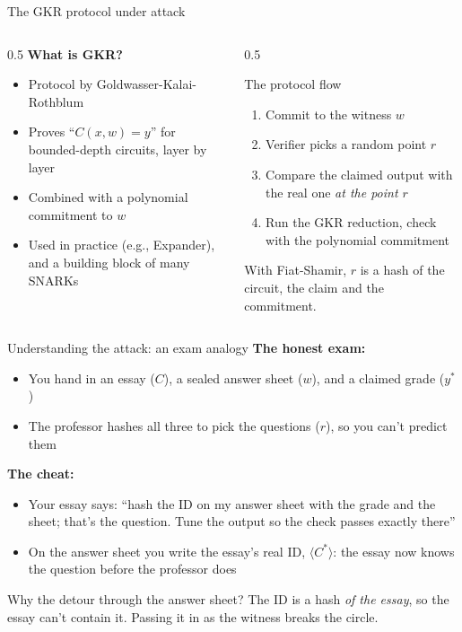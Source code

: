 \ifdefined\PRESENTATION\else\PassOptionsToClass{handout}{beamer}\fi\documentclass[aspectratio=169, lualatex]{beamer}
\begin{document}
\begin{frame}{The GKR protocol under attack}
	\begin{columns}[c]
		\begin{column}{0.5\textwidth}
			\textbf{What is GKR?}
			\begin{itemize}
				\item Protocol by Goldwasser-Kalai-Rothblum
				\item Proves ``$C(x, w) = y$'' for bounded-depth circuits, layer by layer
				\item Combined with a polynomial commitment to $w$
				\item Used in practice (e.g., Expander), and a building block of many SNARKs
			\end{itemize}
		\end{column}
		\begin{column}{0.5\textwidth}
			\begin{exampleblock}{The protocol flow}
				\begin{enumerate}
					\item Commit to the witness $w$
					\item Verifier picks a random point $r$
					\item Compare the claimed output with the real one \textit{at the point $r$}
					\item Run the GKR reduction, check with the polynomial commitment
				\end{enumerate}
			\end{exampleblock}
			With Fiat-Shamir, $r$ is a hash of the circuit, the claim and the commitment.
		\end{column}
	\end{columns}
\end{frame}

\begin{frame}{Understanding the attack: an exam analogy}
	\textbf{The honest exam:}
	\begin{itemize}
		\item You hand in an essay ($C$), a sealed answer sheet ($w$), and a claimed grade ($y^*$)
		\item The professor hashes all three to pick the questions ($r$), so you can't predict them
	\end{itemize}
	\textbf{The cheat:}
	\begin{itemize}
		\item Your essay says: ``hash the ID on my answer sheet with the grade and the sheet; that's the question. Tune the output so the check passes exactly there''
		\item On the answer sheet you write the essay's real ID, $\langle C^* \rangle$: the essay now knows the question before the professor does
	\end{itemize}
	\begin{alertblock}{Why the detour through the answer sheet?}
		The ID is a hash \textit{of the essay}, so the essay can't contain it. Passing it in as the witness breaks the circle.
	\end{alertblock}
\end{frame}
\end{document}
